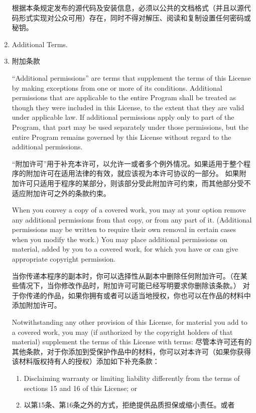 \documentclass[11pt]{article}
\begin{document}
\begin{enumerate}
        根据本条规定发布的源代码及安装信息，必须以公共的文档格式（并且以源代码形式实现对公众可用）存在，同时不得对解压、阅读和复制设置任何密码或秘钥。

  \item Additional Terms.
  \item 附加条款

        ``Additional permissions'' are terms that supplement the terms of this
        License by making exceptions from one or more of its conditions.
        Additional permissions that are applicable to the entire Program shall
        be treated as though they were included in this License, to the extent
        that they are valid under applicable law.  If additional permissions
        apply only to part of the Program, that part may be used separately
        under those permissions, but the entire Program remains governed by
        this License without regard to the additional permissions.

        “附加许可”用于补充本许可，以允许一或者多个例外情况。如果适用于整个程序的附加许可在适用法律的有效，就应该视为本许可协议的一部分。
        如果附加许可只适用于程序的某部分，则该部分受此附加许可约束，而其他部分受不适应附加许可之外的条款约束。

        When you convey a copy of a covered work, you may at your option
        remove any additional permissions from that copy, or from any part of
        it.  (Additional permissions may be written to require their own
        removal in certain cases when you modify the work.)  You may place
        additional permissions on material, added by you to a covered work,
        for which you have or can give appropriate copyright permission.

        当你传递本程序的副本时，你可以选择性从副本中删除任何附加许可。（在某些情况下，当你修改作品时，附加许可可能已经写明要求你删除该条款。）
        对于你传递的作品，如果你拥有或者可以适当地授权，你也可以在作品的材料中添加附加许可。

        Notwithstanding any other provision of this License, for material you
        add to a covered work, you may (if authorized by the copyright holders of
        that material) supplement the terms of this License with terms:
        尽管本许可还有的其他条款，对于你添加到受保护作品中的材料，你可以对本许可（如果你获得该材料版权持有人的授权）添加如下补充条款：
        \begin{enumerate}
          \item Disclaiming warranty or limiting liability differently from the
                terms of sections 15 and 16 of this License; or
          \item 以第15条、第16条之外的方式，拒绝提供品质担保或缩小责任。或者


\end{enumerate}
\end{enumerate}
\end{document}
